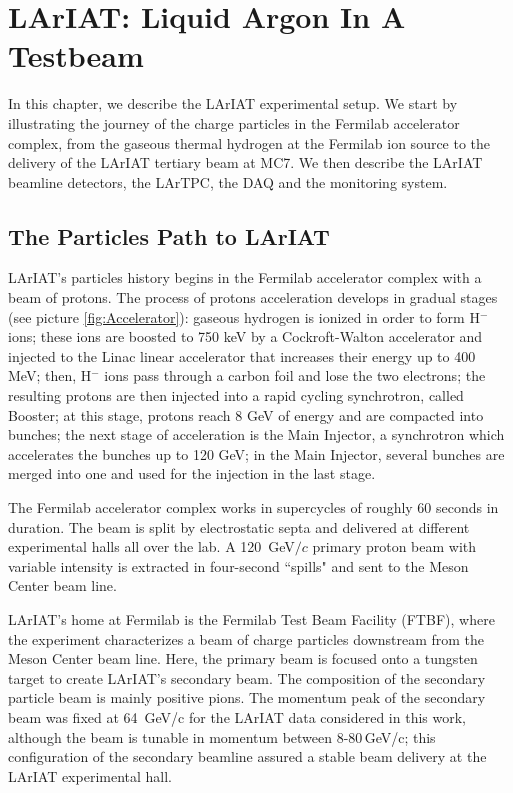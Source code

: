 
\chapter{LArIAT: Liquid Argon In A Testbeam}\label{sec:experimentDescription}
In this chapter, we describe the LArIAT experimental setup. We start by illustrating the journey of the charge particles in the Fermilab accelerator complex, from the gaseous thermal hydrogen at the Fermilab ion source to the delivery of the LArIAT tertiary beam at MC7. We  then describe the LArIAT beamline detectors, the LArTPC, the DAQ and the monitoring system.

\section{The Particles Path to LArIAT}

LArIAT's particles history begins in the Fermilab accelerator complex with a beam of protons. The process of protons acceleration develops in gradual stages (see picture \ref{fig:Accelerator}): gaseous hydrogen is ionized in order to form H$^{-}$ ions; these ions are boosted to 750 keV by a Cockroft-Walton accelerator and injected to the Linac linear accelerator that increases their energy up to 400 MeV; then, H$^{-}$ ions pass through a carbon foil and lose the two electrons; the resulting protons are then injected into a rapid cycling synchrotron, called Booster; at this stage, protons reach 8 GeV of energy and are compacted into bunches; the next stage of acceleration is the Main Injector, a synchrotron which accelerates the bunches up to 120 GeV; in the Main Injector, several bunches are merged into one and used for the injection in the last stage.


The Fermilab accelerator complex works in supercycles of roughly 60 seconds in duration. The beam is split by electrostatic septa and delivered at different experimental halls all over the lab. A 120~GeV$/c$ primary proton beam with variable intensity is extracted in four-second ``spills" and sent to the Meson Center beam line. 

LArIAT's home at Fermilab is the Fermilab Test Beam Facility (FTBF), where the experiment characterizes a beam of charge particles downstream from the Meson Center beam line. 
Here, the primary beam is focused onto a tungsten target to create LArIAT's secondary beam. The composition of the secondary particle beam is mainly positive pions. The momentum peak of the secondary beam was fixed at 64~GeV/c for the LArIAT data considered in this work, although the beam is tunable in momentum between 8-80\,GeV/c; this configuration of the secondary beamline assured a stable beam delivery at the LArIAT experimental hall.
 

